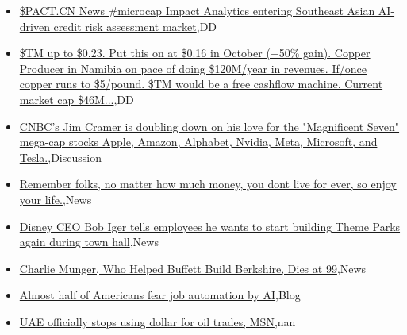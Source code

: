 \documentclass{article}%
\begin{document}
%
\begin{itemize}%
\item%
\href{https://reddit.com/r/Baystreetbets/comments/18642zn/pactcn\_news\_microcap\_impact\_analytics\_entering/}{\$PACT.CN News \#microcap Impact Analytics entering Southeast Asian AI-driven credit risk assessment market},DD%
\item%
\href{https://reddit.com/r/Baystreetbets/comments/1863gj7/tm\_up\_to\_023\_put\_this\_on\_at\_016\_in\_october\_50/}{\$TM up to \$0.23. Put this on at \$0.16 in October (+50\% gain). Copper Producer in Namibia on pace of doing \$120M/year in revenues. If/once copper runs to \$5/pound. \$TM would be a free cashflow machine. Current market cap \$46M...},DD%
\item%
\href{https://reddit.com/r/StockMarket/comments/186evrd/cnbcs\_jim\_cramer\_is\_doubling\_down\_on\_his\_love\_for/}{CNBC's Jim Cramer is doubling down on his love for the "Magnificent Seven" mega-cap stocks  Apple, Amazon, Alphabet, Nvidia, Meta, Microsoft, and Tesla.},Discussion%
\item%
\href{https://reddit.com/r/StockMarket/comments/186eslw/remember\_folks\_no\_matter\_how\_much\_money\_you\_dont/}{Remember folks, no matter how much money, you dont live for ever, so enjoy your life.},News%
\item%
\href{https://reddit.com/r/StockMarket/comments/1868nd6/disney\_ceo\_bob\_iger\_tells\_employees\_he\_wants\_to/}{Disney CEO Bob Iger tells employees he wants to start building Theme Parks again during town hall},News%
\item%
\href{https://reddit.com/r/StockMarket/comments/18674xd/charlie\_munger\_who\_helped\_buffett\_build\_berkshire/}{Charlie Munger, Who Helped Buffett Build Berkshire, Dies at 99},News%
\item%
\href{https://reddit.com/r/Economics/comments/186kc0k/almost\_half\_of\_americans\_fear\_job\_automation\_by\_ai/}{Almost half of Americans fear job automation by AI},Blog%
\item%
\href{https://reddit.com/r/Economics/comments/186agxq/uae\_officially\_stops\_using\_dollar\_for\_oil\_trades/}{UAE officially stops using dollar for oil trades, MSN},nan%
\end{itemize}%
\end{document}
